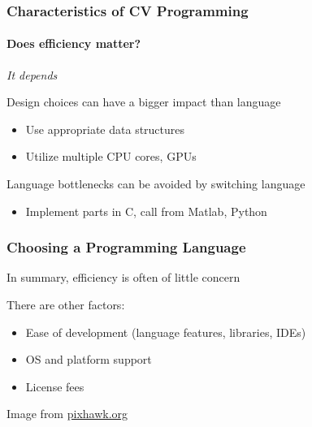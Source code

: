 \documentclass[xetex,professionalfont]{beamer}
\begin{document}
\begin{frame}
\frametitle{Characteristics of CV Programming}
\framesubtitle{Does efficiency matter?}

\emph{It depends}

\bigskip
Design choices can have a bigger impact than language
\begin{itemize}
	\item Use appropriate data structures
	\item Utilize multiple CPU cores, GPUs
\end{itemize}

\bigskip
Language bottlenecks can be avoided by switching language
\begin{itemize}
	\item Implement parts in C, call from Matlab, Python
\end{itemize}

\end{frame}


\begin{frame}
\frametitle{Choosing a Programming Language}

In summary, efficiency is often of little concern

\bigskip
There are other factors:
\begin{itemize}
	\item Ease of development (language features, libraries, IDEs)
	\item OS and platform support %
	\item License fees %
\end{itemize}

\begin{center}
	{\centering Image from \url{pixhawk.org}}
\end{center}

\end{frame}

\end{document}
